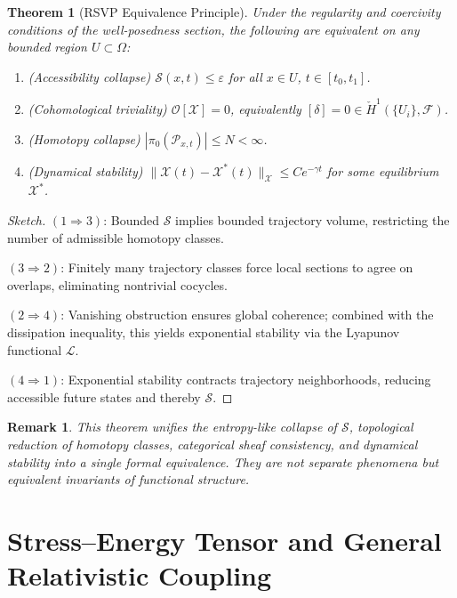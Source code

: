 \documentclass[11pt, a4paper, twocolumn]{article}
\newtheorem{theorem}[definition]{Theorem}
\newtheorem{remark}[definition]{Remark}
\newcommand{\X}{\mathcal{X}}
\newcommand{\Sfield}{\mathcal{S}}
\begin{document}
\begin{theorem}[RSVP Equivalence Principle]
Under the regularity and coercivity conditions of the well-posedness section,
the following are equivalent on any bounded region $U \subset \Omega$:
\begin{enumerate}
\item \emph{(Accessibility collapse)} $\Sfield(x,t) \leq \varepsilon$ for all
$x \in U$, $t \in [t_0,t_1]$.
\item \emph{(Cohomological triviality)} $\mathcal{O}[\X] = 0$, equivalently
$[\delta] = 0 \in \check{H}^1(\{U_i\},\mathcal{F})$.
\item \emph{(Homotopy collapse)} $|\pi_0(\mathcal{P}_{x,t})| \leq N < \infty$.
\item \emph{(Dynamical stability)} $\|\X(t) - \X^*(t)\|_\mathcal{X} \leq
Ce^{-\gamma t}$ for some equilibrium $\X^*$.
\end{enumerate}
\end{theorem}

\begin{proof}[Sketch]
$(1\Rightarrow 3)$: Bounded $\Sfield$ implies bounded trajectory volume,
restricting the number of admissible homotopy classes.

$(3\Rightarrow 2)$: Finitely many trajectory classes force local sections to
agree on overlaps, eliminating nontrivial cocycles.

$(2\Rightarrow 4)$: Vanishing obstruction ensures global coherence; combined
with the dissipation inequality, this yields exponential stability via the
Lyapunov functional $\mathcal{L}$.

$(4\Rightarrow 1)$: Exponential stability contracts trajectory neighborhoods,
reducing accessible future states and thereby $\Sfield$.
\end{proof}

\begin{remark}
This theorem unifies the entropy-like collapse of $\Sfield$, topological
reduction of homotopy classes, categorical sheaf consistency, and dynamical
stability into a single formal equivalence. They are not separate phenomena
but equivalent invariants of functional structure.
\end{remark}

\section{Stress--Energy Tensor and General Relativistic Coupling}
\end{document}

